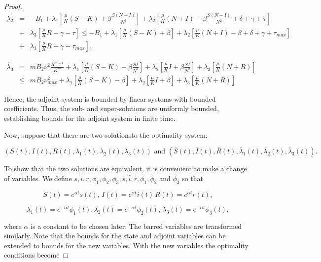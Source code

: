\begin{proof}
\begin{eqnarray*}
	\dot{\lambda_2}&=& 
	-B_1+\lambda_1\left[\frac{\mu}{K}(S-K)+\beta\frac{S(N-I)}{N^2}\right]+\lambda_2\left[\frac{\mu}{K}(N+I)-\beta\frac{S(N-I)}{N^2}+\delta+\gamma+\tau
	 \right]\\
	&+&\lambda_3\left[\frac{\mu}{K}R-\gamma-\tau\right]\leq-B_1+\lambda_1\left[\frac{\mu}{K}(S-K)+\beta\right]+\lambda_2\left[\frac{\mu}{K}(N+I)-\beta+\delta+\gamma+\tau_{max}
	 \right]\\
	&+&\lambda_3\left[\frac{\mu}{K}R-\gamma-\tau_{max}\right].
\end{eqnarray*}
	
\begin{eqnarray*}
	\dot{\lambda_3}&=& 
	mB_2\nu^2\frac{R^{m-1}}{K^m}+\lambda_1\left[\frac{\mu}{K}(S-K)-\beta\frac{SI}{N^2}\right]+\lambda_2\left[\frac{\mu}{K}I+\beta\frac{SI}{N^2}\right]+\lambda_3\left[\frac{\mu}{K}(N+R)\right]\\
	&\leq& 
	mB_2\nu^2_{max}+\lambda_1\left[\frac{\mu}{K}(S-K)-\beta\right]+\lambda_2\left[\frac{\mu}{K}I+\beta\right]+\lambda_3\left[\frac{\mu}{K}(N+R)\right]
\end{eqnarray*}

Hence, the adjoint system is bounded by linear systems with bounded 
coefficients. Thus, the sub- and super-solutions are uniformly bounded, 
establishing bounds for the adjoint system in finite time.

Now, suppose that there are two solutionsto the optimality system:

$$(S(t),I(t),R(t),\lambda_1(t),\lambda_2(t),\lambda_3(t))\,\,\mbox{and}\,\, 
(\bar{S}(t),\bar{I}(t),\bar{R}(t),\bar{\lambda}_1(t),\bar{\lambda}_2(t),\bar{\lambda}_3(t)).$$

To show that the two solutions are equivalent, it is convenient to make a 
change of variables. We define 
$s,i,r,\phi_1,\phi_2,\phi_3,\bar{s},\bar{i},\bar{r},\bar{\phi}_1,\bar{\phi}_2$ 
and $\bar{\phi}_3$ so that

$$S(t)=e^{\alpha t}s(t),\, I(t)=e^{\alpha t}i(t)\, R(t)=e^{\alpha t}r(t),$$

$$\lambda_1(t)=e^{-\alpha t}\phi_1(t), \lambda_2(t)=e^{-\alpha t}\phi_2(t),\, 
\lambda_3(t)=e^{-\alpha t}\phi_3(t),$$

where $\alpha$ is a constant to be chosen later. The barred variables are 
transformed similarly. Note that the bounds for the state and adjoint variables 
can be extended to bounds for the new variables. With the new variables the 
optimality conditions become


\end{proof}
